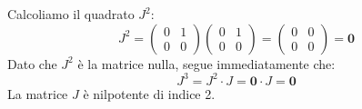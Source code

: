 \begin{solbox}
Calcoliamo il quadrato $J^2$:
$$ J^2 = \begin{pmatrix} 0 & 1 \\ 0 & 0 \end{pmatrix} \begin{pmatrix} 0 & 1 \\ 0 & 0 \end{pmatrix} = \begin{pmatrix} 0 & 0 \\ 0 & 0 \end{pmatrix} = \mathbf{0} $$
Dato che $J^2$ è la matrice nulla, segue immediatamente che:
$$ J^3 = J^2 \cdot J = \mathbf{0} \cdot J = \mathbf{0} $$
La matrice $J$ è nilpotente di indice 2.
\end{solbox}
